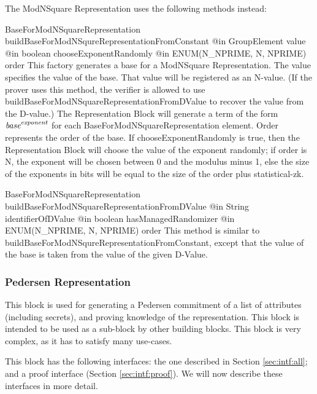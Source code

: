       The ModNSquare Representation uses the following methods instead:

      \begin{method}
      {BaseForModNSquareRepresentation}
      {buildBaseForModNSqureRepresentationFromConstant}
      {
        {@in GroupElement value}
        {@in boolean chooseExponentRandomly}
        {@in ENUM(N\_NPRIME, N, NPRIME) order}
      }
      This factory generates a base for a ModNSquare Representation.
      The value specifies the value of the base. That value will be registered as an N-value.
      (If the prover uses this method, the verifier is allowed to use
      buildBaseForModNSquareRepresentationFromDValue to recover the value from the D-value.)
      The Representation Block will generate
      a term of the form $\emph{base}^{\emph{exponent}}$ for each BaseForModNSquareRepresentation element.
      Order represents the order of the base.
      If chooseExponentRandomly is true, then the Representation Block will choose the value of the exponent randomly; if order is N,
      the exponent will be chosen between 0 and the modulus minus 1, else the size of the exponents in bits will be equal to the size of the
      order plus statistical-zk.
      \end{method}
      \begin{method}
      {BaseForModNSquareRepresentation}
      {buildBaseForModNSquareRepresentationFromDValue}
      {
        {@in String identifierOfDValue}
        {@in boolean hasManagedRandomizer}
        {@in ENUM(N\_NPRIME, N, NPRIME) order}
      }
      This method is similar to buildBaseForModNSqureRepresentationFromConstant,
      except that the value
      of the base is taken from the value of the given D-Value.
      \end{method}

    \subsubsection{Pedersen Representation}

    This block is used for generating a Pedersen commitment of a list
    of attributes (including secrets), and proving knowledge of the representation.
    This block is intended to be used as a sub-block by other building
    blocks. This block is very complex, as it has to satisfy many use-cases.

    This block has the following interfaces:
    the one described in Section \ref{sec:intf:all};
    and a proof interface (Section \ref{sec:intf:proof}).
      We will now describe these interfaces in more detail.

